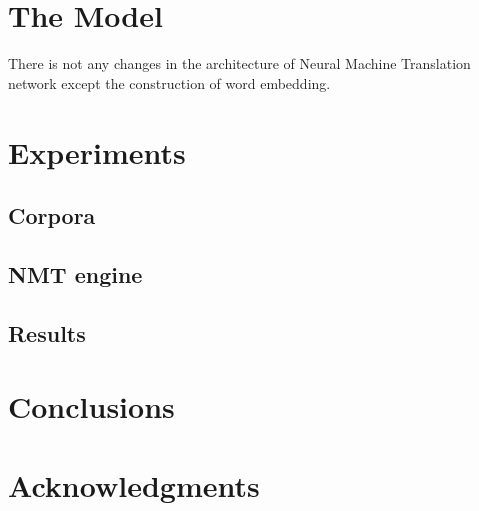 \documentclass[11pt,a4paper]{article}
\begin{document}
\section{The Model}
There is not any changes in the architecture of Neural Machine Translation network except the construction of word embedding. 

\section{Experiments}

\subsection{Corpora}

\subsection{NMT engine}

\subsection{Results}

\section{Conclusions}

\section*{Acknowledgments}



\end{document}
